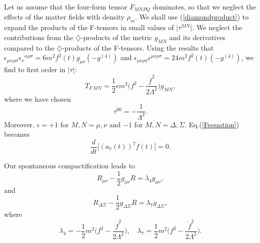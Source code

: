 \documentclass[a4paper,12pt]{article}
\begin{document}
Let us assume that the four-form tensor
$F_{MNPQ}$ dominates, so that we neglect the effects of the
matter fields with density $\rho_m$. We shall use
(\ref{diamondproduct}) to expand the products of the F-tensors
in small values of $\vert\tau^{MN}\vert$. We neglect the
contributions from the $\diamondsuit$-products of the metric
$g_{MN}$ and its derivatives compared to the
$\diamondsuit$-products of the F-tensors. Using the results that
$\epsilon_{\mu\alpha\rho\sigma}{\epsilon_\nu}^{\alpha\rho\sigma}
=6m^2f^2(t)g_{\mu\nu}(-g^{(4)})$ and
$\epsilon_{\mu\nu\rho\sigma}\epsilon^{\mu\nu\rho\sigma}=24m^2f^2(t)(-g^{(4)})$,
we find to first order in $\vert\tau\vert$:
\begin{equation}
T_{F\,MN}=\frac{1}{2}\epsilon
m^2\biggl(f^2-\frac{{\dot f}^2}{2\Lambda^2}\biggr)g_{MN},
\end{equation}
where we have chosen
\begin{equation}
\tau^{00}=-\frac{1}{\Lambda^2}.
\end{equation}
Moreover, $\epsilon =+1$ for $M,N=\mu,\nu$ and $-1$ for
$M,N=\Delta,\Sigma$. Eq.(\ref{Fequation}) becomes
\begin{equation}
\frac{d}{dt}\biggl[(a_7(t))^7f(t)\biggr]=0.
\end{equation}

Our spontaneous compactification leads to
\begin{equation}
\label{R1} R_{\mu\nu}-\frac{1}{2}g_{\mu\nu}R=\lambda_4g_{\mu\nu},
\end{equation} and
\begin{equation}
\label{R2}
R_{\Delta\Sigma}-\frac{1}{2}g_{\Delta\Sigma}R=\lambda_7g_{\Delta\Sigma},
\end{equation}
where
\begin{equation}
\lambda_4=-\frac{1}{2}m^2\biggl(f^2-\frac{{\dot
f}^2}{2\Lambda^2}\biggr),\quad \lambda_7
=\frac{1}{2}m^2\biggl(f^2-\frac{{\dot f}^2}{2\Lambda^2}\biggr).
\end{equation}
\end{document}
